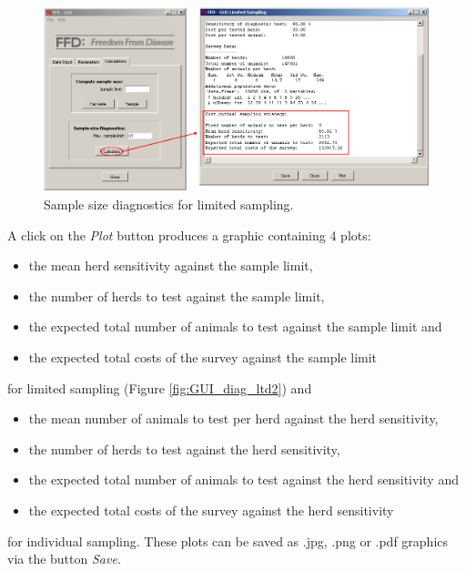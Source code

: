 \documentclass[nojss]{jss}
\begin{document}
\begin{figure}[h!t]
\begin{center}
\includegraphics[width=120mm]{GUI_diag_ltd1.png}
\end{center}
\caption{Sample size diagnostics for limited sampling.} \label{fig:GUI_diag_ltd1}
\end{figure}

A click on the \emph{Plot} button produces a graphic containing 4 plots:
%
\begin{itemize}
\item the mean herd sensitivity against the sample limit,
\item the number of herds to test against the sample limit,
\item the expected total number of animals to test against the sample limit and
\item the expected total costs of the survey against the sample limit
\end{itemize}
%
for limited sampling (Figure \ref{fig:GUI_diag_ltd2}) and
%
\begin{itemize}
\item the mean number of animals to test per herd against the herd sensitivity,
\item the number of herds to test against the herd sensitivity,
\item the expected total number of animals to test against the herd sensitivity and
\item the expected total costs of the survey against the herd sensitivity
\end{itemize}
%
for individual sampling. These plots can be saved as .jpg, .png or .pdf graphics via the button \emph{Save}.
\end{document}

